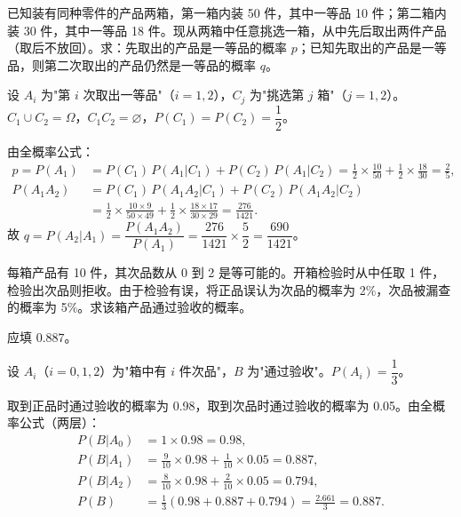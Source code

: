 \documentclass[lang=cn,11pt]{elegantbook}
\begin{document}
\begin{exercise}\label{exer:1-41}
已知装有同种零件的产品两箱，第一箱内装 50 件，其中一等品 10 件；第二箱内装 30 件，其中一等品 18 件。现从两箱中任意挑选一箱，从中先后取出两件产品（取后不放回）。求：先取出的产品是一等品的概率 \(p\)；已知先取出的产品是一等品，则第二次取出的产品仍然是一等品的概率 \(q\)。
\end{exercise}

\begin{solution}
设 \(A_i\) 为"第 \(i\) 次取出一等品"（\(i=1,2\)），\(C_j\) 为"挑选第 \(j\) 箱"（\(j=1,2\)）。\(C_1\cup C_2=\Omega\)，\(C_1C_2=\varnothing\)，\(P(C_1)=P(C_2)=\dfrac{1}{2}\)。

由全概率公式：
\begin{align*}
p = P(A_1) &= P(C_1)\,P(A_1|C_1)+P(C_2)\,P(A_1|C_2) = \frac{1}{2}\times\frac{10}{50}+\frac{1}{2}\times\frac{18}{30} = \frac{2}{5}, \\
P(A_1A_2) &= P(C_1)\,P(A_1A_2|C_1)+P(C_2)\,P(A_1A_2|C_2) \\
&= \frac{1}{2}\times\frac{10\times 9}{50\times 49}+\frac{1}{2}\times\frac{18\times 17}{30\times 29} = \frac{276}{1421}.
\end{align*}
故 \(q = P(A_2|A_1) = \dfrac{P(A_1A_2)}{P(A_1)} = \dfrac{276}{1421}\times\dfrac{5}{2} = \dfrac{690}{1421}\)。
\end{solution}

\begin{exercise}\label{exer:1-42}
每箱产品有 10 件，其次品数从 0 到 2 是等可能的。开箱检验时从中任取 1 件，检验出次品则拒收。由于检验有误，将正品误认为次品的概率为 2\%，次品被漏查的概率为 5\%。求该箱产品通过验收的概率。
\end{exercise}

\begin{solution}
应填 \(0.887\)。

设 \(A_i\)（\(i=0,1,2\)）为"箱中有 \(i\) 件次品"，\(B\) 为"通过验收"。\(P(A_i)=\dfrac{1}{3}\)。

取到正品时通过验收的概率为 0.98，取到次品时通过验收的概率为 0.05。由全概率公式（两层）：
\begin{align*}
P(B|A_0) &= 1\times 0.98 = 0.98, \\
P(B|A_1) &= \frac{9}{10}\times 0.98 + \frac{1}{10}\times 0.05 = 0.887, \\
P(B|A_2) &= \frac{8}{10}\times 0.98 + \frac{2}{10}\times 0.05 = 0.794, \\
P(B) &= \frac{1}{3}(0.98+0.887+0.794) = \frac{2.661}{3} = 0.887.
\end{align*}
\end{solution}
\end{document}
